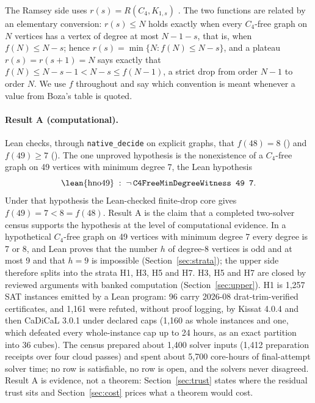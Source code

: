 \documentclass{anvil-paper}
\newcommand{\hnoFortyNine}{\lean{hno49}}
\theoremstyle{definition}
\begin{document}
The Ramsey side uses $r(s)=R(C_4,K_{1,s})$ \citep{boza2024ramsey,zhang2017polarity}. The two functions are related by an elementary conversion: $r(s)\le N$ holds exactly when every $C_4$-free graph on $N$ vertices has a vertex of degree at most $N-1-s$, that is, when $f(N)\le N-s$; hence $r(s)=\min\{N: f(N)\le N-s\}$, and a plateau $r(s)=r(s+1)=N$ says exactly that $f(N)\le N-s-1<N-s\le f(N-1)$, a strict drop from order $N-1$ to order $N$. We use $f$ throughout and say which convention is meant whenever a value from Boza's table is quoted.

\paragraph{Result A (computational).} Lean checks, through \texttt{native\_decide} on explicit graphs, that $f(48)=8$ () and $f(49)\ge 7$ (). The one unproved hypothesis is the nonexistence of a $C_4$-free graph on 49 vertices with minimum degree 7, the Lean hypothesis
\[
\text{\hnoFortyNine} \;:\; \neg\,\text{\texttt{C4FreeMinDegreeWitness 49 7}} .
\]
Under that hypothesis the Lean-checked finite-drop core gives $f(49)=7<8=f(48)$. Result A is the claim that a completed two-solver census supports the hypothesis at the level of computational evidence. In a hypothetical $C_4$-free graph on 49 vertices with minimum degree 7 every degree is 7 or 8, and Lean proves that the number $h$ of degree-8 vertices is odd and at most 9 and that $h=9$ is impossible (Section~\ref{sec:strata}); the upper side therefore splits into the strata H1, H3, H5 and H7. H3, H5 and H7 are closed by reviewed arguments with banked computation (Section~\ref{sec:upper}). H1 is 1,257 SAT instances emitted by a Lean program: 96 carry 2026-08 drat-trim-verified certificates, and 1,161 were refuted, without proof logging, by Kissat 4.0.4 and then CaDiCaL 3.0.1 under declared caps (1,160 as whole instances and one, which defeated every whole-instance cap up to 24 hours, as an exact partition into 36 cubes). The census prepared about 1,400 solver inputs (1,412 preparation receipts over four cloud passes) and spent about 5,700 core-hours of final-attempt solver time; no row is satisfiable, no row is open, and the solvers never disagreed. Result A is evidence, not a theorem: Section~\ref{sec:trust} states where the residual trust sits and Section~\ref{sec:cost} prices what a theorem would cost.
\end{document}
